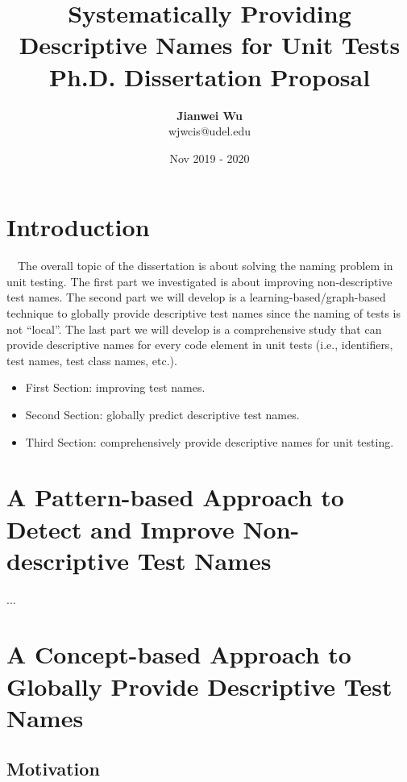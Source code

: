 \documentclass{article}
\title{Systematically Providing Descriptive Names for Unit Tests \\ 
Ph.D. Dissertation Proposal}
\author{\textbf{Jianwei Wu} \\
\small wjwcis@udel.edu}
\date{Nov 2019 - 2020}
\begin{document}
\maketitle

\tableofcontents

\section{Introduction}

~~The overall topic of the dissertation is about solving the naming problem in unit testing.
%
The first part we investigated is about improving non-descriptive test names.
%
The second part we will develop is a learning-based\slash graph-based technique to globally provide descriptive test names since the naming of tests is not \enquote{local}.
%
The last part we will develop is a comprehensive study that can provide descriptive names for every code element in unit tests (i.e., identifiers, test names, test class names, etc.).


\begin{itemize}
	\item First Section: improving test names.
	\item Second Section: globally predict descriptive test names.
	\item Third Section: comprehensively provide descriptive names for unit testing.
\end{itemize}

\section{A Pattern-based Approach to Detect and Improve Non-descriptive Test Names}

...


\section{A Concept-based Approach to Globally Provide Descriptive Test Names}


\subsection{Motivation}
\end{document}
